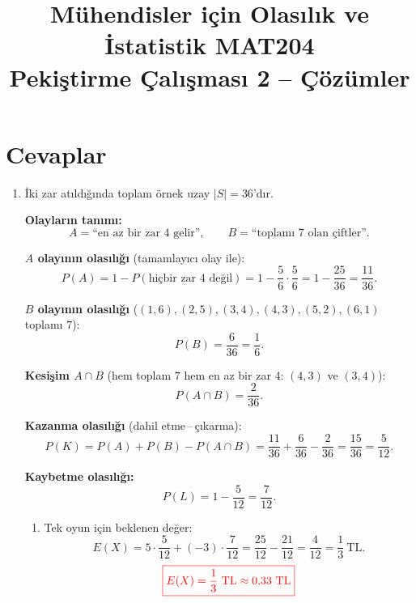 \documentclass[12pt,a4paper]{article}
\title{\textbf{\color{TitleColor}Mühendisler için Olasılık ve İstatistik MAT204\\[0.3cm]
Pekiştirme Çalışması 2 -- Çözümler}}
\author{}
\date{}
\begin{document}
\maketitle

\section*{\textbf{\color{TitleColor}Cevaplar}}

\begin{enumerate}

\item İki zar atıldığında toplam örnek uzay $|S|=36$'dır.

\textbf{Olayların tanımı:}
\[
A=\text{``en az bir zar 4 gelir''},\qquad B=\text{``toplamı 7 olan çiftler''}.
\]

\textbf{$A$ olayının olasılığı} (tamamlayıcı olay ile):
\[
P(A)=1-P(\text{hiçbir zar 4 değil})=1-\frac{5}{6}\cdot\frac{5}{6}=1-\frac{25}{36}=\frac{11}{36}.
\]

\textbf{$B$ olayının olasılığı} ($(1,6),(2,5),(3,4),(4,3),(5,2),(6,1)$ toplamı $7$):
\[
P(B)=\frac{6}{36}=\frac{1}{6}.
\]

\textbf{Kesişim $A\cap B$} (hem toplam $7$ hem en az bir zar $4$: $(4,3)$ ve $(3,4)$):
\[
P(A\cap B)=\frac{2}{36}.
\]

\textbf{Kazanma olasılığı} (dahil etme\,--\,çıkarma):
\[
P(K)=P(A)+P(B)-P(A\cap B)=\frac{11}{36}+\frac{6}{36}-\frac{2}{36}=\frac{15}{36}=\frac{5}{12}.
\]

\textbf{Kaybetme olasılığı:}
\[
P(L)=1-\frac{5}{12}=\frac{7}{12}.
\]

\begin{center}
\end{center}

\begin{enumerate}
\item Tek oyun için beklenen değer:
\[
E(X)=5\cdot\frac{5}{12}+(-3)\cdot\frac{7}{12}=\frac{25}{12}-\frac{21}{12}=\frac{4}{12}=\frac{1}{3}\ \text{TL}.
\]
\[
{\color{red}\boxed{E(X)=\frac{1}{3}\ \text{TL}\approx 0{,}33\ \text{TL}}}
\]


\end{enumerate}
\end{enumerate}
\end{document}
